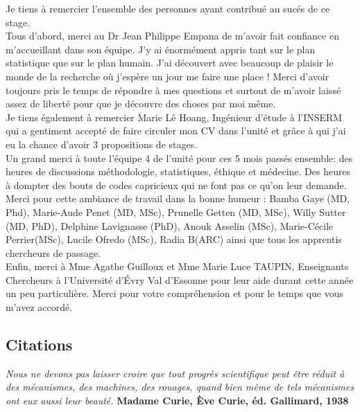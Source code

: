 \documentclass{book}
\begin{document}
\noindent
Je tiens à remercier l'ensemble des personnes ayant contribué au sucés de ce stage.\\

\noindent
Tous d'abord, merci au Dr Jean Philippe Empana de m'avoir fait confiance en m'accueillant dans son équipe. 
J'y ai énormément appris tant sur le plan statistique que sur le plan humain. J'ai découvert avec beaucoup de plaisir le monde de la recherche où j'espère un jour me faire une place !
Merci d'avoir toujours pris le temps de répondre à mes questions et surtout de m'avoir laissé assez de liberté pour que je découvre des choses par moi même.\\

\noindent
Je tiens également à remercier Marie Lê Hoang, Ingénieur d'étude à l'INSERM qui a gentiment accepté de faire circuler mon CV dans l'unité et grâce à qui j'ai eu la chance d'avoir 3 propositions de stages.\\

\noindent
Un grand merci à toute l'équipe 4 de l'unité pour ces 5 mois passés ensemble: des heures de discussions méthodologie, statistiques, éthique et médecine. Des heures à dompter des bouts de codes capricieux qui ne font pas ce qu'on leur demande. Merci pour cette ambiance de travail dans la bonne humeur : Bamba Gaye (MD, Phd), Marie-Aude Penet (MD, MSc), Prunelle Getten (MD, MSc), Willy Sutter (MD, PhD), Delphine Lavignasse (PhD), Anouk Asselin (MSc), Marie-Cécile Perrier(MSc), Lucile Ofredo (MSc), Radia B(ARC) ainsi que tous les apprentis chercheurs de passage.\\

\noindent
Enfin, merci à Mme Agathe Guilloux et Mme Marie Luce TAUPIN, Enseignants Chercheurs à l'Université d'Évry Val 
d'Essonne pour leur aide durant cette année un peu particulière. Merci pour votre compréhension et pour le temps que vous m'avez accordé.


\newpage
\begin{center}
\section*{Citations}
\end{center} 

\bigskip


\begin{flushright}
\textit{Nous ne devons pas laisser croire que tout progrès scientifique peut être réduit à des mécanismes, des machines, des rouages, quand bien même de tels mécanismes ont eux aussi leur beauté.}
\textbf{Madame Curie, Ève Curie, éd. Gallimard, 1938}
\end{flushright}
\end{document}
